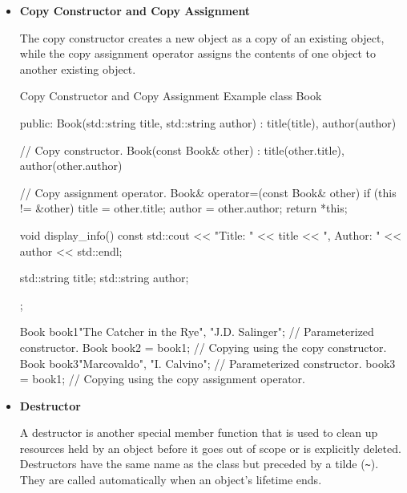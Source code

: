\begin{itemize}
\begin{neonlisting}[language=C++]{Initializer List Example}
{    double length;
    double width;
};

// Creating an object and initializing it using an initializer list.
Rectangle rectangle{5.0, 3.0};
const double area = rectangle.calculate_area();
\end{neonlisting}

    \begin{warningblock}
        \textbf{Warning}: The initialization list must have the same order of variables within the parenthesis.
    \end{warningblock}
    
    \item \textbf{Copy Constructor and Copy Assignment}
    
    The copy constructor creates a new object as a copy of an existing object, while the copy assignment operator assigns the contents of one object to another existing object.
    
    \begin{neonlisting}[language=C++]{Copy Constructor and Copy Assignment Example}
class Book {
public:
    Book(std::string title, std::string author) : title(title), author(author) {}

    // Copy constructor.
    Book(const Book& other) : title(other.title), author(other.author) {}

    // Copy assignment operator.
    Book& operator=(const Book& other) {
        if (this != &other) {
            title = other.title;
            author = other.author;
        }
        return *this;
    }

    void display_info() const {
        std::cout << "Title: " << title << ", Author: " << author << std::endl;
    }
    
    std::string title;
    std::string author;
};

Book book1{"The Catcher in the Rye", "J.D. Salinger"}; // Parameterized constructor.
Book book2 = book1; // Copying using the copy constructor.
Book book3{"Marcovaldo", "I. Calvino"}; // Parameterized constructor.
book3 = book1; // Copying using the copy assignment operator.
\end{neonlisting}
    
    \item \textbf{Destructor}
    
    A destructor is another special member function that is used to clean up resources held by an object before it goes out of scope or is explicitly deleted. Destructors have the same name as the class but preceded by a tilde (\texttt{\~}). They are called automatically when an object's lifetime ends.
    

\end{itemize}

